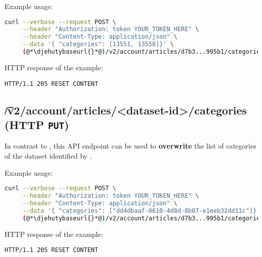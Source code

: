   Example usage:
\begin{lstlisting}[language=bash]
curl --verbose --request POST \
     --header "Authorization: token YOUR_TOKEN_HERE" \
     --header "Content-Type: application/json" \
     --data '{ "categories": [13551, 13558]}' \
     (@*\djehutybaseurl{}*@)/v2/account/articles/d7b3...995b1/categories
\end{lstlisting}

  HTTP response of the example:
\begin{lstlisting}
HTTP/1.1 205 RESET CONTENT
\end{lstlisting}

\subsection{\t{/v2/account/articles/<dataset-id>/categories} (HTTP \texttt{PUT})}

  In contrast to , this API endpoint
  can be used to \textbf{overwrite} the list of categories of the dataset identified
  by \code{dataset-id}.

  Example usage:
\begin{lstlisting}[language=bash]
curl --verbose --request POST \
     --header "Authorization: token YOUR_TOKEN_HERE" \
     --header "Content-Type: application/json" \
     --data '{ "categories": ["dd4dbaaf-0610-4d8d-8b07-e1eeb32dd11c"]}' \
     (@*\djehutybaseurl{}*@)/v2/account/articles/d7b3...995b1/categories
\end{lstlisting}

  HTTP response of the example:
\begin{lstlisting}
HTTP/1.1 205 RESET CONTENT
\end{lstlisting}




